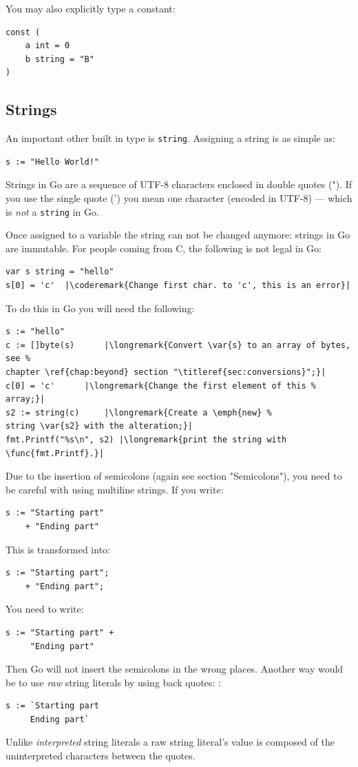 You may also explicitly type a constant:
\begin{lstlisting}
const (
	a int = 0
	b string = "B"
)
\end{lstlisting}

\subsection{Strings}
An important other built in type is \lstinline{string}. Assigning a
string is as simple as:
\begin{lstlisting}
s := "Hello World!"
\end{lstlisting}
Strings in Go are a sequence of UTF-8 characters enclosed in double
quotes ("). If you use the single quote (') you mean one character
(encoded in UTF-8) --- which is \emph{not} a \lstinline{string} in Go.

Once assigned to a variable the string can not be changed anymore: strings in Go are
immutable. For
people coming from C, the following is not legal in Go:
\begin{lstlisting}
var s string = "hello"
s[0] = 'c'  |\coderemark{Change first char. to 'c', this is an error}|
\end{lstlisting}
To do this in Go you will need the following:
\begin{lstlisting}
s := "hello"
c := []byte(s)	    |\longremark{Convert \var{s} to an array of bytes, see %
chapter \ref{chap:beyond} section "\titleref{sec:conversions}";}|
c[0] = 'c'	    |\longremark{Change the first element of this %
array;}|
s2 := string(c)     |\longremark{Create a \emph{new} %
string \var{s2} with the alteration;}|
fmt.Printf("%s\n", s2) |\longremark{print the string with \func{fmt.Printf}.}|
\end{lstlisting}
\showremarks

\begin{lbar}
Due to the insertion of semicolons (again see \cite{effective_go} section
"Semicolons"), you need to be careful with using multiline strings. If
you write:
\begin{lstlisting}
s := "Starting part"
    + "Ending part"
\end{lstlisting}
This is transformed into:
\begin{lstlisting}
s := "Starting part";
    + "Ending part";
\end{lstlisting}
You need to write:
\begin{lstlisting}
s := "Starting part" +
     "Ending part"
\end{lstlisting}
Then Go will not insert the semicolons in the wrong places. Another way
would be to use \emph{raw} string literals by using back quotes: :
\begin{lstlisting}
s := `Starting part
     Ending part`
\end{lstlisting}
\end{lbar}
Unlike \emph{interpreted} string literals  a raw string literal's value
is composed of the uninterpreted characters between the quotes.
